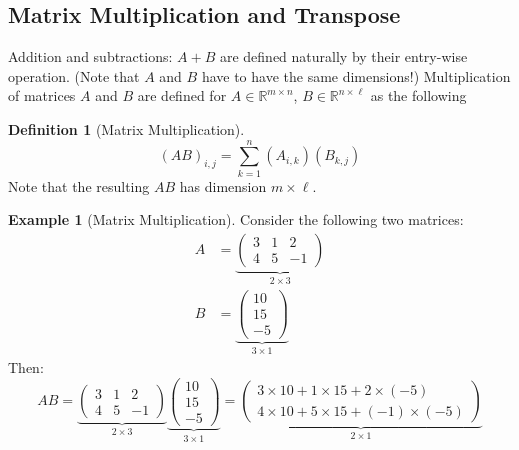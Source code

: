 \documentclass[12pt, a4paper]{article}
\newcommand{\R}{\mathbb{R}}
\theoremstyle{remark}
\theoremstyle{definition}
\newtheorem{definition}{Definition}
\newtheorem{example}{Example}
\numberwithin{equation}{section}
\numberwithin{definition}{section}
\numberwithin{example}{section}
\numberwithin{exercise}{section}
\numberwithin{remark}{section}
\numberwithin{figure}{section}
\begin{document}
\subsection{Matrix Multiplication and Transpose}
Addition and subtractions: $A + B$ are defined naturally by their entry-wise operation. (Note that $A$ and $B$ have to have the same dimensions!)
Multiplication of matrices $A$ and $B$ are defined for $A \in \R^{m \times n}$, $B \in \R^{n \times \ell}$ as the following
\begin{definition}[Matrix Multiplication]
    \begin{equation*}
        \left( A B \right)_{i, j} = \sum_{k = 1}^{n} \left( A_{i,k} \right) \left( B_{k,j} \right)
    \end{equation*}
    Note that the resulting $AB$ has dimension $m \times \ell$.
\end{definition}
\begin{example}[Matrix Multiplication]
    Consider the following two matrices:
    \begin{align*}
        A &=
        \underbrace{
        \begin{pmatrix}
            3 & 1 & 2 \\
            4 & 5 & -1
    \end{pmatrix}}_{2 \times 3} \\
        B &=
        \underbrace{
        \begin{pmatrix}
            10 \\
            15 \\
            -5
        \end{pmatrix}
    }_{3 \times 1}
    \end{align*}
    Then:
    \begin{equation*}
        AB = 
        \underbrace{
        \begin{pmatrix}
            3 & 1 & 2 \\
            4 & 5 & -1
    \end{pmatrix}}_{2 \times 3}
        \underbrace{
        \begin{pmatrix}
            10 \\
            15 \\
            -5
        \end{pmatrix}
    }_{3 \times 1}
    =
    \underbrace{
    \begin{pmatrix}
        3 \times 10 + 1 \times 15 + 2 \times (-5) \\
        4 \times 10 + 5 \times 15 + (-1) \times (-5)
    \end{pmatrix}
}_{2 \times 1}
    \end{equation*}
\end{example}
\end{document}
